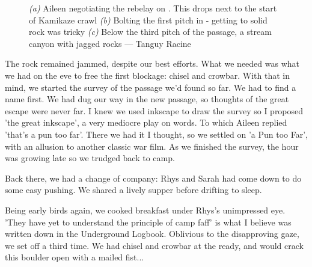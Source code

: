 \begin{figure}[t!]
\checkoddpage \ifoddpage \forcerectofloat \else \forceversofloat \fi
\centering
    \begin{subfigure}[t]{0.316\textwidth}
        \centering
        \caption{} \label{Bolting a Pun Too Far}
    \end{subfigure}
\hfill    
\begin{subfigure}[t]{0.674\textwidth}
    \centering
        \caption{} \label{Canyon of A Pun Too Far}
    \end{subfigure}
    \begin{subfigure}[t]{\textwidth}
\centering
{}
 \caption{}\label{milka pitch}
\end{subfigure}
    \caption{
    \emph{(a)} Aileen negotiating the rebelay on \protect{}. This drops next to the start of Kamikaze crawl
    \emph{(b)} Bolting the first pitch in \protect{} - getting to solid rock was tricky
    \emph{(c)} Below the third pitch of the passage, a stream canyon with jagged rocks --- Tanguy Racine }
\end{figure}

The rock remained jammed, despite our best efforts. What we needed was what we had on the eve to free the first blockage: chisel and crowbar. With that in mind, we started the survey of the passage we'd found so far. We had to find a name first. We had dug our way in the new passage, so thoughts of the great escape were never far. I knew we used inkscape to draw the survey so I proposed 'the great inkscape', a very mediocre play on words. To which Aileen replied 'that's a pun too far'. There we had it I thought, so we settled on 'a Pun too Far', with an allusion to another classic war film. As we finished the survey, the hour was growing late so we trudged back to camp.

Back there, we had a change of company: Rhys and Sarah had come down to do some easy pushing. We shared a lively supper before drifting to sleep.

Being early birds again, we cooked breakfast under Rhys's unimpressed eye. 'They have yet to understand the principle of camp faff' is what I believe was written down in the Underground Logbook. Oblivious to the disapproving gaze, we set off a third time. We had chisel and crowbar at the ready, and would crack this boulder open with a mailed fist...

